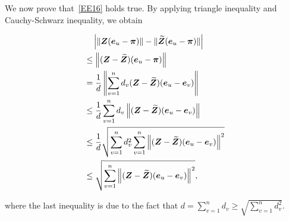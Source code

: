 \documentclass[10pt,twocolumn,twoside]{IEEEtran}
\begin{document}
\begin{IEEEproof}
    We now prove that~\eqref{EE16} holds true.  By applying triangle inequality and Cauchy-Schwarz inequality, we obtain
    \begin{small}
        \begin{align*}
             & \quad \left|\left\Vert\boldsymbol{Z}(\boldsymbol{e}_u-\boldsymbol{\pi})\right\Vert-\|\widetilde{\boldsymbol{Z}}(\boldsymbol{e}_u-\boldsymbol{\pi})\| \right|                                 \\
             & \le \left\Vert(\boldsymbol{Z}-\widetilde{\boldsymbol{Z}})(\boldsymbol{e}_u-\boldsymbol{\pi})\right\Vert                                                           \\
             & = \frac{1}{d} \left\Vert\sum_{v=1}^{n} d_v (\boldsymbol{Z}-\widetilde{\boldsymbol{Z}})(\boldsymbol{e}_u-\boldsymbol{e}_v)\right\Vert                             \\
             & \le \frac{1}{d} \sum_{v=1}^{n} d_v \left\Vert(\boldsymbol{Z}-\widetilde{\boldsymbol{Z}})(\boldsymbol{e}_u-\boldsymbol{e}_v)\right\Vert                           \\
             & \le \frac{1}{d} \sqrt{\sum_{v=1}^{n} d_v^2 \sum_{v=1}^{n} \left\Vert(\boldsymbol{Z}-\widetilde{\boldsymbol{Z}})(\boldsymbol{e}_u-\boldsymbol{e}_v)\right\Vert^2} \\
             & \le \sqrt{\sum_{v=1}^{n} \left\Vert(\boldsymbol{Z}-\widetilde{\boldsymbol{Z}})(\boldsymbol{e}_u-\boldsymbol{e}_v)\right\Vert^2},
        \end{align*}
    \end{small}
    where the last inequality is due to the fact that \(d=\sum_{v=1}^{n} d_v\ge \sqrt{\sum_{v=1}^{n} d_v^2}\).


\end{IEEEproof}
\end{document}
